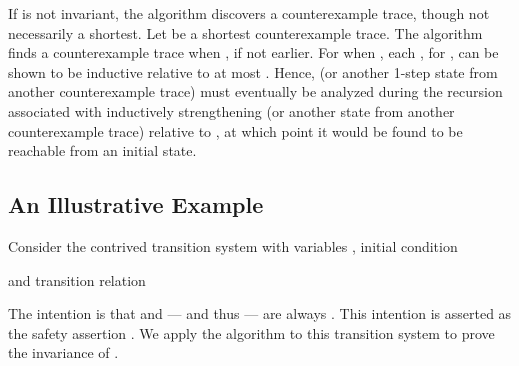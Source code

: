 \documentclass{llncs}
\begin{document}
If  is not invariant, the algorithm discovers a counterexample
trace, though not necessarily a shortest.  Let  be
a shortest counterexample trace.  The algorithm finds a counterexample
trace when , if not earlier.  For when , each , for
, can be shown to be inductive relative to at most
.  Hence,  (or another 1-step state from another
counterexample trace) must eventually be analyzed during the recursion
associated with inductively strengthening  (or another state from
another counterexample trace) relative to , at which point it
would be found to be reachable from an initial state.

\subsection{An Illustrative Example}
\label{subsec:illustration}

Consider the contrived transition system  with
variables , initial condition

and transition relation

The intention is that  and  --- and thus  --- are always
.  This intention is asserted as the safety assertion .
We apply the algorithm to this transition system to prove the
invariance of .
\end{document}
